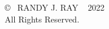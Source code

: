 \thispagestyle{empty}
\mbox{}
\vfill
\begin{center}
\copyright ~ RANDY J. RAY ~ 2022 \\
All Rights Reserved.
\end{center}
\pagebreak
